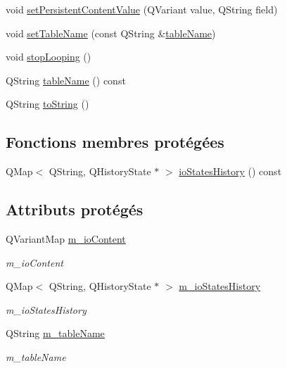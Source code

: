 \begin{DoxyCompactItemize}
\item 
void \hyperlink{classSh__LoopingInOutStateMachine_aa7d8c9cc870607ed9ef75319bff88500}{set\-Persistent\-Content\-Value} (Q\-Variant value, Q\-String field)
\item 
void \hyperlink{classSH__InOutStateMachine_a437a730d07ddd15bd96314ab0b6cf40e}{set\-Table\-Name} (const Q\-String \&\hyperlink{classSH__InOutStateMachine_a18b07a985695100612bbcbda870933b4}{table\-Name})
\item 
void \hyperlink{classSh__LoopingInOutStateMachine_a8788fa9e4c3149bcf7554e2a2b960c51}{stop\-Looping} ()
\item 
Q\-String \hyperlink{classSH__InOutStateMachine_a18b07a985695100612bbcbda870933b4}{table\-Name} () const 
\item 
Q\-String \hyperlink{classSH__InOutStateMachine_a60ecd7de03d948e2d1e9cbedb5c3e5fa}{to\-String} ()
\end{DoxyCompactItemize}
\subsection*{Fonctions membres protégées}
\begin{DoxyCompactItemize}
\item 
Q\-Map$<$ Q\-String, Q\-History\-State $\ast$ $>$ \hyperlink{classSH__InOutStateMachine_a4ec3ebb4c40ea57c63afdf5976e62a94}{io\-States\-History} () const 
\end{DoxyCompactItemize}
\subsection*{Attributs protégés}
\begin{DoxyCompactItemize}
\item 
Q\-Variant\-Map \hyperlink{classSH__InOutStateMachine_a661a1c7bd3b1086b3b5cd60ca957ecbd}{m\-\_\-io\-Content}
\begin{DoxyCompactList}\small\item\em m\-\_\-io\-Content \end{DoxyCompactList}\item 
Q\-Map$<$ Q\-String, Q\-History\-State $\ast$ $>$ \hyperlink{classSH__InOutStateMachine_aaca2ea542b3f5b4cd238396b07492455}{m\-\_\-io\-States\-History}
\begin{DoxyCompactList}\small\item\em m\-\_\-io\-States\-History \end{DoxyCompactList}\item 
Q\-String \hyperlink{classSH__InOutStateMachine_acc0f5d5133af2dcca30939f53ec8837b}{m\-\_\-table\-Name}
\begin{DoxyCompactList}\small\item\em m\-\_\-table\-Name \end{DoxyCompactList}\end{DoxyCompactItemize}
